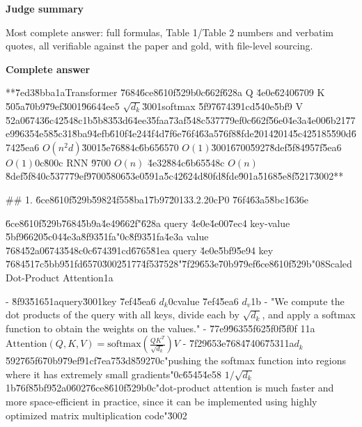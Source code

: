 \documentclass[10pt]{article}
\begin{document}
\textbf{Judge summary}
\begin{EvidenceText}
Most complete answer: full formulas, Table 1/Table 2 numbers and verbatim quotes, all verifiable against the paper and gold, with file-level sourcing.
\end{EvidenceText}

\textbf{Complete answer}
\begin{AnswerText}
**\u7ed3\u8bba\uff1aTransformer \u7684\u6ce8\u610f\u529b\uff0c\u662f\u628a Q \u4e0e\u6240\u6709 K \u505a\u70b9\u79ef\u3001\u9664\u4ee5 $\sqrt{d_k}$\u3001softmax \u5f97\u6743\u91cd\u540e\u5bf9 V \u52a0\u6743\u6c42\u548c\uff1b\u5b83\u53d6\u4ee3\u5faa\u73af\u548c\u5377\u79ef\uff0c\u662f\u56e0\u4e3a\u4e00\u6b21\u77e9\u9635\u4e58\u5c31\u8ba9\u4efb\u610f\u4e24\u4f4d\u7f6e\u76f4\u63a5\u76f8\u8fde\u2014\u2014\u5c42\u5185\u590d\u6742\u5ea6 $O(n^2 d)$\u3001\u5e76\u884c\u6b65\u6570 $O(1)$\u3001\u6700\u5927\u8def\u5f84\u957f\u5ea6 $O(1)$\uff0c\u800c RNN \u9700 $O(n)$ \u4e32\u884c\u6b65\u548c $O(n)$ \u8def\u5f84\uff0c\u5377\u79ef\u9700\u5806\u53e0\u591a\u5c42\u624d\u80fd\u8fde\u901a\u5168\u5e8f\u5217\u3002**

## 1. \u6ce8\u610f\u529b\u5982\u4f55\u8ba1\u7b97\u20133.2.2\uff0cP0 \u76f4\u63a5\u8bc1\u636e

\u6ce8\u610f\u529b\u7684\u5b9a\u4e49\u662f"\u628a query \u4e0e\u4e00\u7ec4 key-value \u5bf9\u6620\u5c04\u4e3a\u8f93\u51fa"\uff0c\u8f93\u51fa\u4e3a value \u7684\u52a0\u6743\u548c\uff0c\u6743\u91cd\u6765\u81ea query \u4e0e\u5bf9\u5e94 key \u7684\u517c\u5bb9\u51fd\u6570\u3002\u5177\u4f53\u7528"\u7f29\u653e\u70b9\u79ef\u6ce8\u610f\u529b"\uff08Scaled Dot-Product Attention\uff1a

- \u8f93\u5165\uff1aquery\u3001key \u7ef4\u5ea6 $d_k$\uff0cvalue \u7ef4\u5ea6 $d_v$\uff1b
- "We compute the dot products of the query with all keys, divide each by $\sqrt{d_k}$, and apply a softmax function to obtain the weights on the values."
- \u77e9\u9635\u5f62\u5f0f\u5f0f 1\uff1a$\mathrm{Attention}(Q,K,V)=\mathrm{softmax}\!\left(\frac{QK^T}{\sqrt{d_k}}\right)V$
- \u7f29\u653e\u7684\u7406\u7531\uff1a$d_k$ \u5927\u65f6\u70b9\u79ef\u91cf\u7ea7\u53d8\u5927\uff0c"pushing the softmax function into regions where it has extremely small gradients"\uff0c\u6545\u4e58 $1/\sqrt{d_k}$\uff1b\u76f8\u5bf9\u52a0\u6027\u6ce8\u610f\u529b\uff0c"dot-product attention is much faster and more space-efficient in practice, since it can be implemented using highly optimized matrix multiplication code"\u3002


\end{AnswerText}
\end{document}
